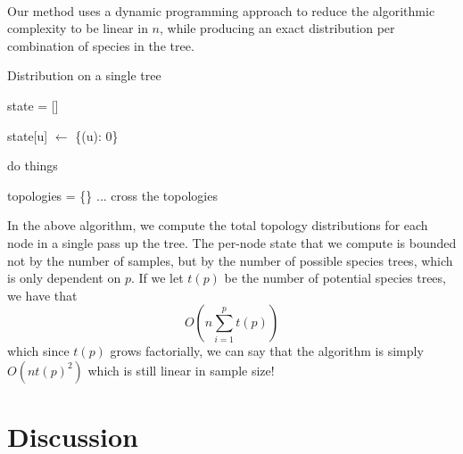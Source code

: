 \documentclass{article}
\begin{document}
\paragraph{}
Our method uses a dynamic programming approach to reduce the algorithmic
complexity to be linear in $n$, while producing an exact distribution per
combination of species in the tree.
\begin{algorithm}
    \caption{Distribution on a single tree}
    \begin{algorithmic}
        \State state = []

            \State state[u] $\leftarrow$ \{(u): 0\}
        \EndProcedure

            \State do things
        \EndProcedure

            \State {}
        \EndFor

            \State topologies = \{\}
                \State ... cross the topologies
            \EndFor
        \EndFor
    \end{algorithmic}
\end{algorithm}
In the above algorithm, we compute the total topology distributions for each node
in a single pass up the tree. The per-node state that we compute is bounded not by the
number of samples, but by the number of possible species trees, which is only dependent
on $p$. If we let $t(p)$ be the number of potential species trees, we have that
\[
    O(n \sum_{i=1}^p t(p))
\]
which since $t(p)$ grows factorially, we can say that the algorithm is simply $O(n t(p)^2)$
which is still linear in sample size!
\section{Discussion}
\end{document}

